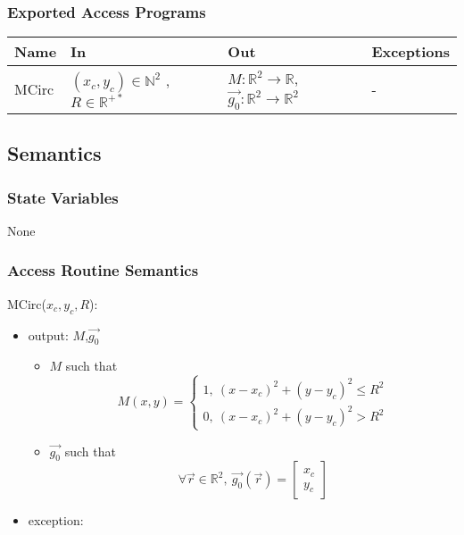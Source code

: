 \documentclass[12pt, titlepage]{article}
\begin{document}
\subsubsection{Exported Access Programs}

\begin{center}
\begin{tabular}{p{2cm} p{4cm} p{4cm} p{2cm}}
\hline
\textbf{Name} & \textbf{In} & \textbf{Out} & \textbf{Exceptions} \\
\hline
MCirc & $(x_c,y_c) \in \mathbb{N}^2$ , $R \in \mathbb{R}^{+*}$ & $M:\mathbb{R}^2\rightarrow\mathbb{R}$, $\overrightarrow{g_0} :\mathbb{R}^2\rightarrow\mathbb{R}^2$ & - \\
\hline
\end{tabular}
\end{center}

\subsection{Semantics}

\subsubsection{State Variables}
None

\subsubsection{Access Routine Semantics}

\noindent MCirc($x_c,y_c,R$):
\begin{itemize} 
\item output: $M$,$\overrightarrow{g_0}$
	\begin{itemize}
	\item $M$ such that
	\begin{equation*}
	M(x,y)=\begin{cases}
	1, \ (x-x_c)^2+(y-y_c)^2\leq R^2 \\
	0, \ (x-x_c)^2+(y-y_c)^2> R^2
	\end{cases}
	\end{equation*}
	\item $\overrightarrow{g_0}$ such that
	\begin{equation*}
	\forall \vec{r} \in \mathbb{R}^2, \ \overrightarrow{g_0}(\vec{r})=\begin{bmatrix}
	x_c\\
	y_c
	\end{bmatrix}
	\end{equation*}
	\end{itemize}
\item exception:
\end{itemize}
\end{document}
